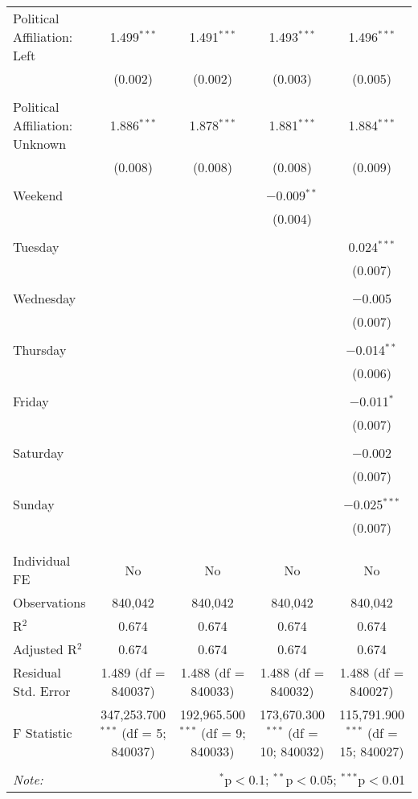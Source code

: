 \documentclass[
]{article}
\begin{document}
\begin{table}[!htbp]
{\begin{tabular}{@{\extracolsep{5pt}}lcccc}
 Political Affiliation: Left & 1.499$^{***}$ & 1.491$^{***}$ & 1.493$^{***}$ & 1.496$^{***}$ \\ 
  & (0.002) & (0.002) & (0.003) & (0.005) \\ 
  & & & & \\ 
 Political Affiliation: Unknown & 1.886$^{***}$ & 1.878$^{***}$ & 1.881$^{***}$ & 1.884$^{***}$ \\ 
  & (0.008) & (0.008) & (0.008) & (0.009) \\ 
  & & & & \\ 
 Weekend &  &  & $-$0.009$^{**}$ &  \\ 
  &  &  & (0.004) &  \\ 
  & & & & \\ 
 Tuesday &  &  &  & 0.024$^{***}$ \\ 
  &  &  &  & (0.007) \\ 
  & & & & \\ 
 Wednesday &  &  &  & $-$0.005 \\ 
  &  &  &  & (0.007) \\ 
  & & & & \\ 
 Thursday &  &  &  & $-$0.014$^{**}$ \\ 
  &  &  &  & (0.006) \\ 
  & & & & \\ 
 Friday &  &  &  & $-$0.011$^{*}$ \\ 
  &  &  &  & (0.007) \\ 
  & & & & \\ 
 Saturday &  &  &  & $-$0.002 \\ 
  &  &  &  & (0.007) \\ 
  & & & & \\ 
 Sunday &  &  &  & $-$0.025$^{***}$ \\ 
  &  &  &  & (0.007) \\ 
  & & & & \\ 
\hline \\[-1.8ex] 
Individual FE & No & No & No & No \\ 
Observations & 840,042 & 840,042 & 840,042 & 840,042 \\ 
R$^{2}$ & 0.674 & 0.674 & 0.674 & 0.674 \\ 
Adjusted R$^{2}$ & 0.674 & 0.674 & 0.674 & 0.674 \\ 
Residual Std. Error & 1.489 (df = 840037) & 1.488 (df = 840033) & 1.488 (df = 840032) & 1.488 (df = 840027) \\ 
F Statistic & 347,253.700$^{***}$ (df = 5; 840037) & 192,965.500$^{***}$ (df = 9; 840033) & 173,670.300$^{***}$ (df = 10; 840032) & 115,791.900$^{***}$ (df = 15; 840027) \\ 
\hline 
\hline \\[-1.8ex] 
\textit{Note:}  & \multicolumn{4}{r}{$^{*}$p$<$0.1; $^{**}$p$<$0.05; $^{***}$p$<$0.01} \\ 
\end{tabular}
} 
\end{table} 
\newpage
\end{document}
